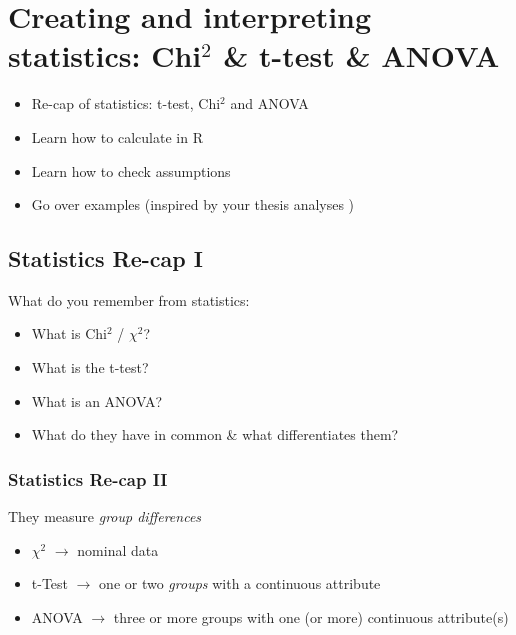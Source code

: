 \documentclass[
]{book}
\providecommand{\tightlist}{%
  \setlength{\itemsep}{0pt}\setlength{\parskip}{0pt}}
\begin{document}
\chapter{\texorpdfstring{Creating and interpreting statistics: Chi\(^2\) \& t-test \& ANOVA}{Creating and interpreting statistics: Chi\^{}2 \& t-test \& ANOVA}}\label{creating-and-interpreting-statistics-chi2-t-test-anova}

\begin{itemize}
\tightlist
\item
  Re-cap of statistics: t-test, Chi\(^2\) and ANOVA
\item
  Learn how to calculate in R
\item
  Learn how to check assumptions
\item
  Go over examples (inspired by your thesis analyses )
\end{itemize}

\section{\texorpdfstring{Statistics Re-cap I}{Statistics Re-cap  I}}\label{statistics-re-cap-i}

What do you remember from statistics:

\begin{itemize}
\tightlist
\item
  What is Chi\(^2\) / \(\chi^2\)?
\item
  What is the t-test?
\item
  What is an ANOVA?
\item
  What do they have in common \& what differentiates them?
\end{itemize}

\subsection{\texorpdfstring{Statistics Re-cap II}{Statistics Re-cap  II}}\label{statistics-re-cap-ii}

They measure \emph{group differences}

\begin{itemize}
\tightlist
\item
  \(\chi^2\) \(\rightarrow\) nominal data
\item
  t-Test \(\rightarrow\) one or two \emph{groups} with a continuous attribute
\item
  ANOVA \(\rightarrow\) three or more groups with one (or more) continuous attribute(s)
\end{itemize}
\end{document}
